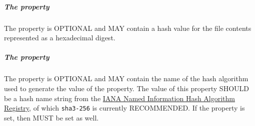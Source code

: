 \subparagraph{The  property}\label{sec:hash}
The  property is OPTIONAL and MAY contain a hash value for the file contents represented as a hexadecimal digest.

\subparagraph{The  property}\label{sec:hashAlgorithm}
The  property is OPTIONAL and MAY contain the name of the hash algorithm used to generate the value of the  property.
The value of this property SHOULD be a hash name string from the \href{https://www.iana.org/assignments/named-information/named-information.xhtml}{IANA Named Information Hash Algorithm Registry}, of which \texttt{sha3-256} is currently RECOMMENDED.
If the  property is set, then  MUST be set as well.
